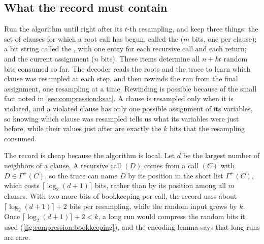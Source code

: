 \begin{refsection}
\subsection{What the record must contain}\label{sec:compression:record}

Run the algorithm until right after its $t$-th resampling, and keep three things: the set of clauses for which a root call has begun, called the  ($m$ bits, one per clause); a bit string called the , with one entry for each recursive call and each return; and the current assignment ($n$ bits). These items determine all $n+kt$ random bits consumed so far. The decoder reads the roots and the trace to learn which clause was resampled at each step, and then rewinds the run from the final assignment, one resampling at a time. Rewinding is possible because of the small fact noted in \cref{sec:compression:ksat}. A clause is resampled only when it is violated, and a violated clause has only one possible assignment of its variables, so knowing which clause was resampled tells us what its variables were just before, while their values just after are exactly the $k$ bits that the resampling consumed.

The record is cheap because the algorithm is local. Let $d$ be the largest number of neighbors of a clause. A recursive call \compressionFix$(D)$ comes from a call \compressionFix$(C)$ with $D\in\Gamma^+(C)$, so the trace can name $D$ by its position in the short list $\Gamma^+(C)$, which costs $\lceil\log_2(d+1)\rceil$ bits, rather than by its position among all $m$ clauses. With two more bits of bookkeeping per call, the record uses about $\lceil\log_2(d+1)\rceil+2$ bits per resampling, while the random input grows by $k$. Once $\lceil\log_2(d+1)\rceil+2<k$, a long run would compress the random bits it used (\cref{fig:compression:bookkeeping}), and the encoding lemma says that long runs are rare.


\end{refsection}
